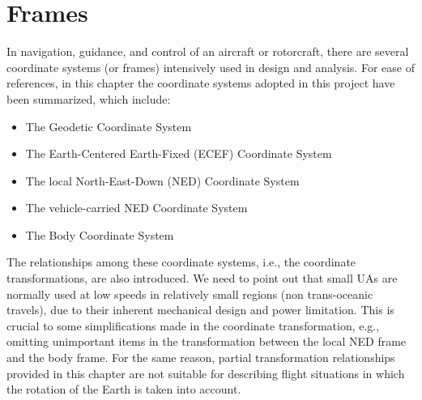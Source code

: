 \chapter{Frames}\label{ch:frames}

In navigation, guidance, and control of an aircraft or rotorcraft, there are several
coordinate systems (or frames) intensively used in design and analysis. For ease of references, in this chapter the coordinate systems adopted in this project have been summarized, which include:

\begin{itemize}
\item{The Geodetic Coordinate System}
\item{The Earth-Centered Earth-Fixed (ECEF) Coordinate System}
\item{The local North-East-Down (NED) Coordinate System}
\item{The vehicle-carried NED Coordinate System}
\item{The Body Coordinate System}
\end{itemize}

The relationships among these coordinate systems, i.e., the coordinate transformations, are also introduced. We need to point out that small UAs are normally used at low speeds in relatively small regions (non trans-oceanic travels), due to their inherent mechanical design and power limitation. This is crucial to some simplifications made in the coordinate transformation, e.g., omitting unimportant items in the transformation between the local NED frame and the body frame. For the same reason, partial transformation relationships provided in this chapter are not suitable for describing flight situations in which the rotation of the Earth is taken into account.